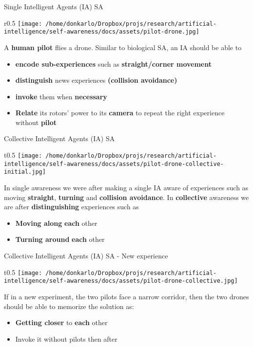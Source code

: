 \documentclass[unknownkeysallowed]{beamer}
\begin{document}
\begin{frame}{Single Intelligent Agents (IA) SA}
	\begin{wrapfigure}{r}{0.5\textwidth}
		\texttt{[image: /home/donkarlo/Dropbox/projs/research/artificial-intelligence/self-awareness/docs/assets/pilot-drone.jpg]} 
	\end{wrapfigure}
	A \textbf{human pilot} flies a drone. Similar to biological SA, an IA should be able to 
	\begin{itemize}
		\item \textbf{encode sub-experiences} such as \textbf{straight/corner movement} 
		\item \textbf{distinguish} news experiences \textbf{(collision avoidance)} 
		\item \textbf{invoke} them when \textbf{necessary}
		\item \textbf{Relate} its rotors' power to its \textbf{camera} to repeat the right experience without \textbf{pilot}
	\end{itemize} 
\end{frame}

\begin{frame}{Collective Intelligent Agents (IA) SA}
	\begin{wrapfigure}{t}{0.5\textwidth}
		\texttt{[image: /home/donkarlo/Dropbox/projs/research/artificial-intelligence/self-awareness/docs/assets/pilot-drone-collective-initial.jpg]} 
	\end{wrapfigure}
	In single awareness we were after making a single IA aware of experiences such as moving \textbf{straight}, \textbf{turning} and \textbf{collision avoidance}. In \textbf{collective} awareness we are after \textbf{distinguishing} experiences such as 
	\begin{itemize}
		\item \textbf{Moving along} \textbf{each} other
		\item \textbf{Turning around} \textbf{each} other
	\end{itemize}
\end{frame}

\begin{frame}{Collective Intelligent Agents (IA) SA - New experience}
	\begin{wrapfigure}{t}{0.5\textwidth}
		\texttt{[image: /home/donkarlo/Dropbox/projs/research/artificial-intelligence/self-awareness/docs/assets/pilot-drone-collective.jpg]} 
	\end{wrapfigure}
	If in a new experiment, the two pilots face a narrow corridor, then the two drones should be able to memorize the solution as:
	\begin{itemize}
		\item \textbf{Getting closer} to \textbf{each} other
		\item Invoke it without pilots then after
	\end{itemize}
\end{frame}
\end{document}
